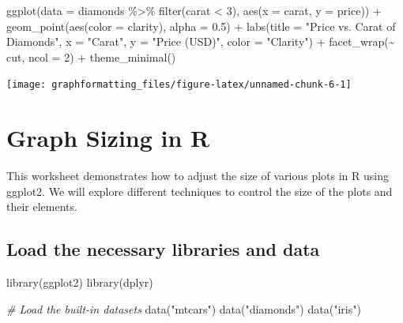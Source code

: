 \documentclass[
]{book}
\newenvironment{Shaded}{\begin{snugshade}}{\end{snugshade}}
\newcommand{\AttributeTok}[1]{\textcolor[rgb]{0.77,0.63,0.00}{#1}}
\newcommand{\CommentTok}[1]{\textcolor[rgb]{0.56,0.35,0.01}{\textit{#1}}}
\newcommand{\DecValTok}[1]{\textcolor[rgb]{0.00,0.00,0.81}{#1}}
\newcommand{\FloatTok}[1]{\textcolor[rgb]{0.00,0.00,0.81}{#1}}
\newcommand{\FunctionTok}[1]{\textcolor[rgb]{0.00,0.00,0.00}{#1}}
\newcommand{\NormalTok}[1]{#1}
\newcommand{\SpecialCharTok}[1]{\textcolor[rgb]{0.00,0.00,0.00}{#1}}
\newcommand{\StringTok}[1]{\textcolor[rgb]{0.31,0.60,0.02}{#1}}
\begin{document}
\begin{Shaded}
\begin{Highlighting}[]
\FunctionTok{ggplot}\NormalTok{(}\AttributeTok{data =}\NormalTok{ diamonds }\SpecialCharTok{\%\textgreater{}\%} \FunctionTok{filter}\NormalTok{(carat }\SpecialCharTok{\textless{}} \DecValTok{3}\NormalTok{), }\FunctionTok{aes}\NormalTok{(}\AttributeTok{x =}\NormalTok{ carat, }\AttributeTok{y =}\NormalTok{ price)) }\SpecialCharTok{+}
  \FunctionTok{geom\_point}\NormalTok{(}\FunctionTok{aes}\NormalTok{(}\AttributeTok{color =}\NormalTok{ clarity), }\AttributeTok{alpha =} \FloatTok{0.5}\NormalTok{) }\SpecialCharTok{+}
  \FunctionTok{labs}\NormalTok{(}\AttributeTok{title =} \StringTok{"Price vs. Carat of Diamonds"}\NormalTok{,}
       \AttributeTok{x =} \StringTok{"Carat"}\NormalTok{,}
       \AttributeTok{y =} \StringTok{"Price (USD)"}\NormalTok{,}
       \AttributeTok{color =} \StringTok{"Clarity"}\NormalTok{) }\SpecialCharTok{+}
  \FunctionTok{facet\_wrap}\NormalTok{(}\SpecialCharTok{\textasciitilde{}}\NormalTok{ cut, }\AttributeTok{ncol =} \DecValTok{2}\NormalTok{) }\SpecialCharTok{+}
  \FunctionTok{theme\_minimal}\NormalTok{()}
\end{Highlighting}
\end{Shaded}

\texttt{[image: graphformatting\_files/figure-latex/unnamed-chunk-6-1]}

\hypertarget{graph-sizing-in-r}{%
\section{Graph Sizing in R}\label{graph-sizing-in-r}}

This worksheet demonstrates how to adjust the size of various plots in R using ggplot2. We will explore different techniques to control the size of the plots and their elements.

\hypertarget{load-the-necessary-libraries-and-data}{%
\subsection{Load the necessary libraries and data}\label{load-the-necessary-libraries-and-data}}

\begin{Shaded}
\begin{Highlighting}[]
\FunctionTok{library}\NormalTok{(ggplot2)}
\FunctionTok{library}\NormalTok{(dplyr)}

\CommentTok{\# Load the built{-}in datasets}
\FunctionTok{data}\NormalTok{(}\StringTok{"mtcars"}\NormalTok{)}
\FunctionTok{data}\NormalTok{(}\StringTok{"diamonds"}\NormalTok{)}
\FunctionTok{data}\NormalTok{(}\StringTok{"iris"}\NormalTok{)}
\end{Highlighting}
\end{Shaded}
\end{document}
